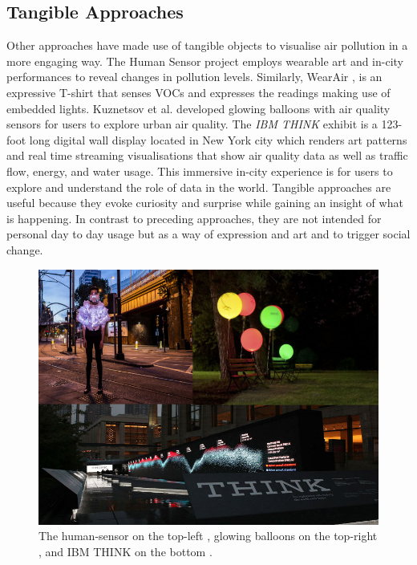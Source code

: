 \subsection{Tangible Approaches}
Other approaches have made use of tangible objects to visualise air pollution in a more engaging way. The Human Sensor project \cite{InvisibleDust2016} employs wearable art and in-city performances to reveal changes in pollution levels. Similarly, WearAir \cite{Kim2010},  is an expressive T-shirt that senses VOCs and expresses the readings making use of embedded lights. Kuznetsov et al. \cite{Kuznetsov2011} developed glowing balloons with air quality sensors for users to explore urban air quality. The \textit{IBM THINK} exhibit \cite{IBM2012} is a 123-foot long digital wall display located in New York city which renders art patterns and real time streaming visualisations  that show air quality data as well as traffic flow, energy, and water usage. This immersive in-city experience is for users to explore and understand the role of data in the world. Tangible approaches are useful because they evoke curiosity and surprise while gaining an insight of what is happening. In contrast to preceding approaches, they are not intended for personal day to day usage but as a way of expression and art and to trigger social change. 

\begin{figure}[H]
\begin{adjustbox}{width=.8\textwidth,center=\textwidth}
  \centering
  \includegraphics[scale=.4]{images/think_human_sensor_balloons.jpg}
\end{adjustbox}
  \caption[Tangible visualisations]{The human-sensor on the top-left \cite{InvisibleDust2016}, glowing balloons on the top-right \cite{Kuznetsov2011}, and IBM THINK on the bottom \cite{IBM2012}.}
  \label{fig:photo_based_instaNO2}
\end{figure}

